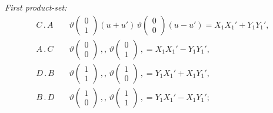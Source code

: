 \documentclass[11pt]{article}
\begin{document}
\textit{First product-set:}
\begin{align*}
C\mathbin{.}A\quad &\vartheta\!\begin{pmatrix} 0 \\ 1 \end{pmatrix}\!(u + u')\,\vartheta\!\begin{pmatrix} 0 \\ 0 \end{pmatrix}\!(u - u') = X_1 X_1' + Y_1 Y_1',\\
A\mathbin{.}C\quad &\vartheta\!\begin{pmatrix} 0 \\ 0 \end{pmatrix}\,,,\,\vartheta\!\begin{pmatrix} 0 \\ 1 \end{pmatrix}\,, = X_1 X_1' - Y_1 Y_1',\\
D\mathbin{.}B\quad &\vartheta\!\begin{pmatrix} 1 \\ 1 \end{pmatrix}\,,,\,\vartheta\!\begin{pmatrix} 1 \\ 0 \end{pmatrix}\,, = Y_1 X_1' + X_1 Y_1',\\
B\mathbin{.}D\quad &\vartheta\!\begin{pmatrix} 1 \\ 0 \end{pmatrix}\,,,\,\vartheta\!\begin{pmatrix} 1 \\ 1 \end{pmatrix}\,, = Y_1 X_1' - X_1 Y_1';
\end{align*}
\end{document}
